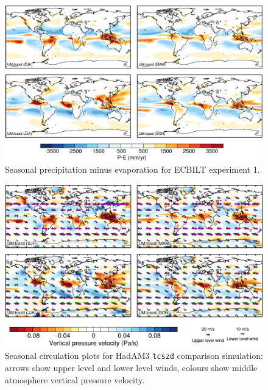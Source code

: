 \documentclass[a4paper,11pt,article]{article}
\begin{document}
\begin{figure}
  \begin{center}
    \includegraphics[width=\textwidth]{../hadam3-comparison/plots/pmine-plots}
  \end{center}
  \caption{Seasonal precipitation minus evaporation for ECBILT
    experiment 1.}
  \label{fig:pmine-hadam3}
\end{figure}

\begin{figure}
  \begin{center}
    \includegraphics[width=\textwidth]{../hadam3-comparison/plots/wind-plots}
  \end{center}
  \caption{Seasonal circulation plots for HadAM3 \texttt{tcszd}
    comparison simulation: arrows show upper level and lower level
    winds, colours show middle atmosphere vertical pressure velocity.}
  \label{fig:wind-hadam3}
\end{figure}
\end{document}
